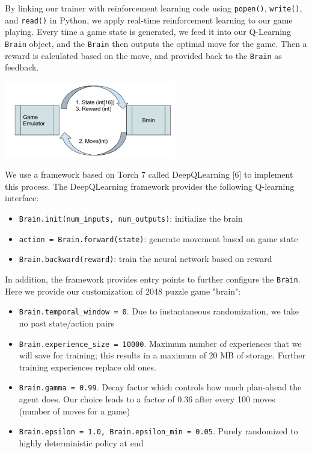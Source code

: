 \documentclass[9pt,twocolumn]{article}
\begin{document}
By linking our trainer with reinforcement learning code using \texttt{popen()}, \texttt{write()}, and \texttt{read()} in Python, we apply real-time reinforcement learning to our game playing. Every time a game state is generated, we feed it into our Q-Learning \texttt{Brain} object, and the \texttt{Brain} then outputs the optimal move for the game. Then a reward is calculated based on the move, and provided back to the \texttt{Brain} as feedback.

\begin{centering}

\includegraphics[width=75mm]{rl_state.png}

\end{centering}

We use a framework based on Torch 7 called DeepQLearning [6] to implement this process. The DeepQLearning framework provides the following Q-learning interface:

\begin{itemize}

\item \texttt{Brain.init(num\_inputs, num\_outputs)}: initialize the brain

\item \texttt{action = Brain.forward(state)}: generate movement based on game state

\item \texttt{Brain.backward(reward)}: train the neural network based on reward

\end{itemize}

In addition, the framework provides entry points to further configure the \texttt{Brain}. Here we provide our customization of 2048 puzzle game "brain":

\begin{itemize}

\item \texttt{Brain.temporal\_window = 0}. Due to instantaneous randomization, we take no past state/action pairs
\item \texttt{Brain.experience\_size = 10000}. Maximum number of experiences that we will save for training; this results in a maximum of 20 MB of storage. Further training experiences replace old ones.
\item \texttt{Brain.gamma = 0.99}. Decay factor which controls how much plan-ahead the agent does. Our choice leads to a factor of 0.36 after every 100 moves (number of moves for a game)
\item \texttt{Brain.epsilon = 1.0, Brain.epsilon\_min = 0.05}. Purely randomized to highly deterministic policy at end

\end{itemize}
\end{document}
